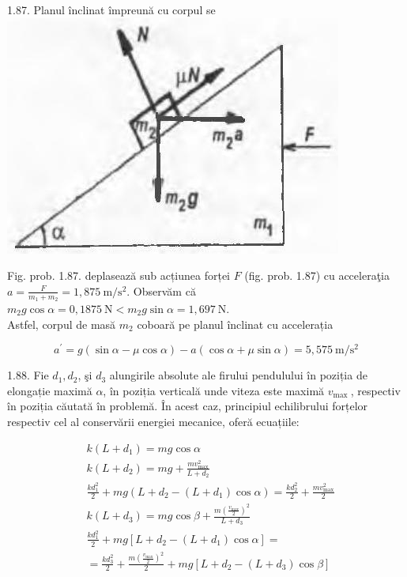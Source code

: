 \documentclass[10pt]{article}
\begin{document}
1.87. Planul înclinat împreună cu corpul se\\
\includegraphics[max width=\textwidth, center]{2025_07_01_5b3ff9fa0d508c8e9f17g-214}

Fig. prob. 1.87. deplasează sub acțiunea forței $F$ (fig. prob. 1.87) cu acceleraţia $a=\frac{F}{m_{1}+m_{2}}=1,875 \mathrm{~m} / \mathrm{s}^{2}$. Observăm că\\
$m_{2} g \cos \alpha=0,1875 \mathrm{~N}<m_{2} g \sin \alpha=1,697 \mathrm{~N}$.\\
Astfel, corpul de masă $m_{2}$ coboară pe planul înclinat cu accelerația

$$
a^{\prime}=g(\sin \alpha-\mu \cos \alpha)-a(\cos \alpha+\mu \sin \alpha)=5,575 \mathrm{~m} / \mathrm{s}^{2}
$$

1.88. Fie $d_{1}, d_{2}$, şi $d_{3}$ alungirile absolute ale firului pendulului în poziția de elongație maximă $\alpha$, în poziția verticală unde viteza este maximă $v_{\text {max }}$, respectiv\\
în poziția căutată în problemă. În acest caz, principiul echilibrului forțelor respectiv cel al conservării energiei mecanice, oferă ecuațiile:

$$
\begin{aligned}
& k\left(L+d_{1}\right)=m g \cos \alpha \\
& k\left(L+d_{2}\right)=m g+\frac{m v_{\max }^{2}}{L+d_{2}} \\
& \frac{k d_{1}^{2}}{2}+m g\left(L+d_{2}-\left(L+d_{1}\right) \cos \alpha\right)=\frac{k d_{2}^{2}}{2}+\frac{m v_{\max }^{2}}{2} \\
& k\left(L+d_{3}\right)=m g \cos \beta+\frac{m\left(\frac{v_{\max }}{2}\right)^{2}}{L+d_{3}} \\
& \frac{k d_{1}^{2}}{2}+m g\left[L+d_{2}-\left(L+d_{1}\right) \cos \alpha\right]= \\
& =\frac{k d_{3}^{2}}{2}+\frac{m\left(\frac{v_{\max }}{2}\right)^{2}}{2}+m g\left[L+d_{2}-\left(L+d_{3}\right) \cos \beta\right]
\end{aligned}
$$
\end{document}
